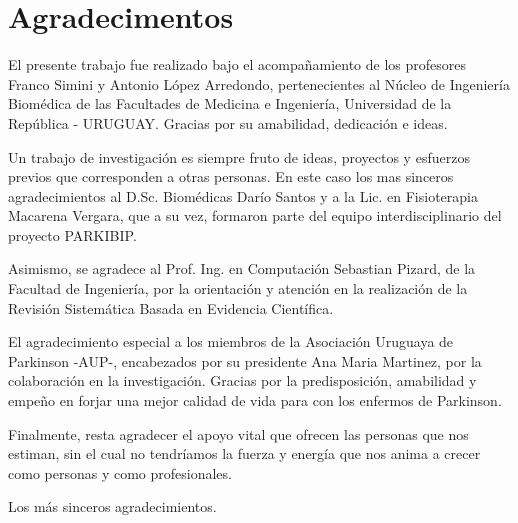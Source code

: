 \chapter*{Agradecimentos}

El presente trabajo fue realizado bajo el acompañamiento de los profesores Franco Simini y Antonio López Arredondo, pertenecientes al Núcleo de Ingeniería Biomédica de las Facultades de Medicina e Ingeniería, Universidad de la República - URUGUAY. Gracias por su amabilidad, dedicación e ideas.

Un trabajo de investigación es siempre fruto de ideas, proyectos y esfuerzos previos que corresponden a otras personas. En este caso los mas sinceros agradecimientos al D.Sc. Biomédicas Darío Santos y a la Lic. en Fisioterapia Macarena Vergara, que a su vez, formaron parte del equipo interdisciplinario del proyecto PARKIBIP.

Asimismo, se agradece al Prof. Ing. en Computación Sebastian Pizard, de la Facultad de Ingeniería, por la orientación y atención en la realización de la Revisión Sistemática Basada en Evidencia Científica.

El agradecimiento especial a los miembros de la Asociación Uruguaya de Parkinson -AUP-, encabezados por su presidente Ana Maria Martinez, por la colaboración en la investigación. Gracias por la predisposición, amabilidad y empeño en forjar una mejor calidad de vida para con los enfermos de Parkinson.

Finalmente, resta agradecer el apoyo vital que ofrecen las personas que nos estiman, sin el cual no tendríamos la fuerza y energía que nos anima a crecer como personas y como profesionales.

Los más sinceros agradecimientos.